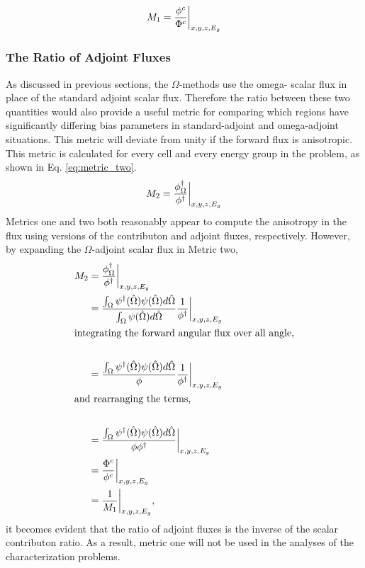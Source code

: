 \begin{equation}
  M_{1} = \frac{\phi^{c}}{\Phi^{c}}\bigg\rvert_{x,y,z,E_g}
  \label{eq:metric_one}
\end{equation}

\subsubsection{The Ratio of Adjoint Fluxes}

As discussed in previous sections, the $\Omega$-methods use the omega- scalar
flux in place of the standard adjoint scalar flux. Therefore the ratio between
these two quantities would also provide a useful metric for comparing which
regions have significantly differing bias parameters in standard-adjoint and
omega-adjoint situations. This metric will deviate from unity if the forward
flux is anisotropic. This metric is calculated for
every cell and every energy group in the problem, as shown in Eq.
\eqref{eq:metric_two}.
%
\begin{equation}
  M_{2} = \frac{\phi^{\dagger}_{\Omega}}{\phi^{\dagger}}\bigg\rvert_{x,y,z,E_g}
  \label{eq:metric_two}
\end{equation}
%
Metrics one and two both reasonably appear to compute the anisotropy in the flux
using versions of the contributon and adjoint fluxes, respectively. However, by
expanding the $\Omega$-adjoint scalar flux in Metric two,
%
\begin{align*}
  M_{2} & = \frac{\phi^{\dagger}_{\Omega}}{\phi^{\dagger}}\bigg\rvert_{x,y,z,E_g} \\
  & = \frac{\int_{\Omega}{\psi^{\dagger}(\hat\Omega) \psi(\hat\Omega)}
      d\hat{\Omega}}{\int_{\Omega}{\psi(\hat\Omega) d\hat{\Omega}}}
           \frac{1}{\phi^{\dagger}}\bigg\rvert_{x,y,z,E_g} \\
\intertext{integrating the forward angular flux over all angle,} \\
  & = \frac{\int_{\Omega}{\psi^{\dagger}(\hat\Omega) \psi(\hat\Omega)}
      d\hat{\Omega}}{\phi}
           \frac{1}{\phi^{\dagger}}\bigg\rvert_{x,y,z,E_g} \\
\intertext{and rearranging the terms,}\\
  & = \frac{\int_{\Omega}{\psi^{\dagger}(\hat\Omega) \psi(\hat\Omega)}
      d\hat{\Omega}}{\phi \phi^{\dagger}}\bigg\rvert_{x,y,z,E_g}\\
  & = \frac{\Phi^{c}}{\phi^{c}}\bigg\rvert_{x,y,z,E_g}\\
  & = \frac{1}{M_{1}}\bigg\rvert_{x,y,z,E_g},
\end{align*}
%
it becomes evident that the ratio of adjoint fluxes is the inverse of the scalar
contributon ratio. As a result, metric one will not be used in the analyses of
the characterization problems.


